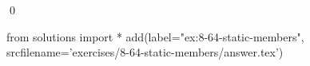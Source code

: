 
\begin{ex}
  \label{ex:8-64-static-members}
  
  \qed
\end{ex}
\begin{python0}
from solutions import *
add(label="ex:8-64-static-members",
    srcfilename='exercises/8-64-static-members/answer.tex')
\end{python0}
